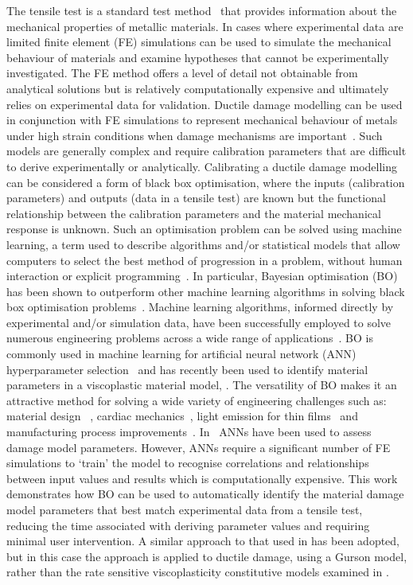 \documentclass[preprint, review, 12pt]{elsarticle}
\begin{document}
	The tensile test is a standard test method~\cite{ENISO6892} that provides information about the mechanical properties of metallic materials.
	In cases where experimental data are limited finite element (FE) simulations can be used to simulate the mechanical behaviour of materials and examine hypotheses that cannot be experimentally investigated.
	The FE method offers a level of detail not obtainable from analytical solutions but is relatively computationally expensive and ultimately relies on experimental data for validation.
	Ductile damage modelling can be used in conjunction with FE simulations to represent mechanical behaviour of metals under high strain conditions when damage mechanisms are important~\cite{ABBASSI2013, CHAHBOUB2019, ZHANG2021}.
	Such models are generally complex and require calibration parameters that are difficult to derive experimentally or analytically.
	Calibrating a ductile damage modelling can be considered a form of black box optimisation, where the inputs (calibration parameters) and outputs (data in a tensile test) are known but the functional relationship between the calibration parameters and the material mechanical response is unknown.
	Such an optimisation problem can be solved using machine learning, a term used to describe algorithms and/or statistical models that allow computers to select the best method of progression in a problem, without human interaction or explicit programming~\cite{BIKMKHAMETOV2020}.
	In particular, Bayesian optimisation (BO) has been shown to outperform other machine learning algorithms in solving black box optimisation problems~\cite{SNOEK2012}.
	Machine learning algorithms, informed directly by experimental and/or simulation data, have been successfully employed to solve numerous engineering problems across a wide range of applications~\cite{MONGAN2022, LIU2020, HEGDE2020}.
	BO is commonly used in machine learning for artificial neural network (ANN) hyperparameter selection~\cite{DEWANCKER2016, MONGAN2022, BIKMKHAMETOV2020, GHAVAMIAN2021} and has recently been used to identify material parameters in a viscoplastic material model, \citet{RYAN2022}.
	The versatility of BO makes it an attractive method for solving a wide variety of engineering challenges such as: material design ~\cite{ZHANG2020, CHUAQUI2021}, cardiac mechanics~\cite{BOROWSKA2022}, light emission for thin films~\cite{WANKERL2022} and manufacturing process improvements~\cite{MONGAN2022, GUNN2022}.
	In~\cite{ABENDROTH2006, ABBASSI2013, CHAHBOUB2019, CHEN2021} ANNs have been used to assess damage model parameters.
	However, ANNs require a significant number of FE simulations to `train' the model to recognise correlations and relationships between input values and results which is computationally expensive.
	This work demonstrates how BO can be used to automatically identify the material damage model parameters that best match experimental data from a tensile test, reducing the time associated with deriving parameter values and requiring minimal user intervention.
	A similar approach to that used in \citet{RYAN2022} has been adopted, but in this case the approach is applied to ductile damage, using a Gurson model, rather than the rate sensitive viscoplasticity constitutive models examined in \citet{RYAN2022}.
\end{document}
